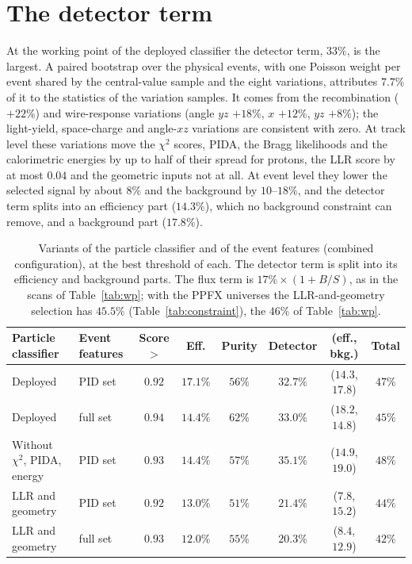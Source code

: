 \documentclass[11pt,a4paper]{article}
\begin{document}
\section{The detector term}
\label{sec:detrobust}

At the working point of the deployed classifier the detector term, $33\%$, is the largest. A paired
bootstrap over the physical events, with one Poisson weight per event shared by the central-value
sample and the eight variations, attributes $7.7\%$ of it to the statistics of the variation samples.
It comes from the recombination ($+22\%$) and wire-response variations (angle $yz$ $+18\%$, $x$
$+12\%$, $yz$ $+8\%$); the light-yield, space-charge and angle-$xz$ variations are consistent with
zero. At track level these variations move the $\chi^2$ scores, PIDA, the Bragg likelihoods and the
calorimetric energies by up to half of their spread for protons, the LLR score by at most $0.04$ and the
geometric inputs not at all. At event level they lower the selected signal by about $8\%$ and the
background by $10$--$18\%$, and the detector term splits into an efficiency part ($14.3\%$), which no
background constraint can remove, and a background part ($17.8\%$).

\begin{table}[H]
  \centering
  \caption{Variants of the particle classifier and of the event features (combined configuration), at
    the best threshold of each. The detector term is split into its efficiency and background parts. The flux term
    is $17\%\times(1+B/S)$, as in the scans of Table~\ref{tab:wp}; with the PPFX universes the LLR-and-geometry
    selection has $45.5\%$ (Table~\ref{tab:constraint}), the $46\%$ of Table~\ref{tab:wp}.}
  \label{tab:detvariants}
  \footnotesize\setlength{\tabcolsep}{4pt}
  \begin{tabular}{llcccccc}
    \toprule
    Particle classifier & Event features & Score $>$ & Eff. & Purity & Detector & (eff., bkg.) & Total \\
    \midrule
    Deployed                       & PID set  & $0.92$ & $17.1\%$ & $56\%$ & $32.7\%$ & ($14.3$, $17.8$) & $47\%$ \\
    Deployed                       & full set & $0.94$ & $14.4\%$ & $62\%$ & $33.0\%$ & ($18.2$, $14.8$) & $45\%$ \\
    Without $\chi^2$, PIDA, energy & PID set  & $0.93$ & $14.4\%$ & $57\%$ & $35.1\%$ & ($14.9$, $19.0$) & $48\%$ \\
    LLR and geometry               & PID set  & $0.92$ & $13.0\%$ & $51\%$ & $21.4\%$ & ($7.8$, $15.2$)  & $44\%$ \\
    LLR and geometry               & full set & $0.93$ & $12.0\%$ & $55\%$ & $20.3\%$ & ($8.4$, $12.9$)  & $42\%$ \\
    \bottomrule
  \end{tabular}
\end{table}
\end{document}

